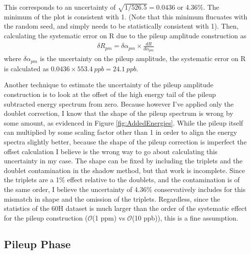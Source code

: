 		This corresponds to an uncertainty of $\sqrt{1/526.5} = 0.0436$ or 4.36\%. The minimum of the \chisq plot is consistent with 1. (Note that this minimum flucuates with the random seed, and simply needs to be statistically consistent with 1). Then, calculating the systematic error on R due to the pileup amplitude construction as 
			\begin{align}
				\delta R_{pm} = \delta\alpha_{pm} \times \frac{dR}{d\alpha_{pm}}
			\end{align}
		where $\delta\alpha_{pm}$ is the uncertainty on the pileup amplitude, the systematic error on R is calculated as $0.0436 \times \SI{553.4}{ppb} = \SI{24.1}{ppb}$.

		Another technique to estimate the uncertainty of the pileup amplitude construction is to look at the offset of the high energy tail of the pileup subtracted energy spectrum from zero. Because however I've applied only the doublet correction, I know that the shape of the pileup spectrum is wrong by some amount, as evidenced in Figure \ref{fig:AddedEnergies}. While the pileup itself can multiplied by some scaling factor other than 1 in order to align the energy spectra slightly better, because the shape of the pileup correction is imperfect the offset calculation I believe is the wrong way to go about calculating this uncertainty in my case. The shape can be fixed by including the triplets and the doublet contamination in the shadow method, but that work is incomplete. Since the triplets are a 1\% effect relative to the doublets, and the contamination is of the same order, I believe the uncertainty of 4.36\% conservatively includes for this mismatch in shape and the omission of the triplets. Regardless, since the statistics of the 60H dataset is much larger than the order of the systematic effect for the pileup construction ($\mathcal{O}$(1 ppm) vs $\mathcal{O}$(10 ppb)), this is a fine assumption.

	\subsection{Pileup Phase}
	\label{SubSec:PileupPhase}

